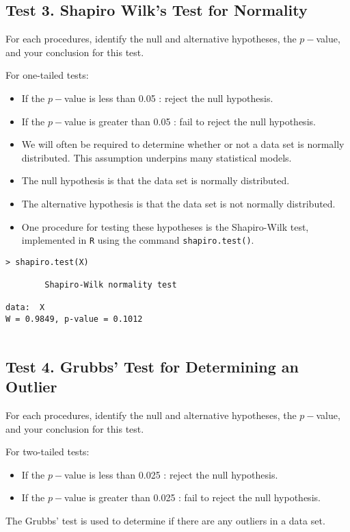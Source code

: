 \subsection*{Test 3. Shapiro Wilk's Test for Normality}

\begin{framed}
For each procedures, identify the null and alternative hypotheses, the $p-$value, and your conclusion for this test.

\noindent For one-tailed tests:
\begin{itemize}
\item If the $p-$value is less than 0.05 : reject the null hypothesis.
\item If the $p-$value is greater than 0.05 : fail to reject the null hypothesis.
\end{itemize}
\end{framed}

\begin{itemize}
\item We will often be required to determine whether or not a data set is normally distributed.
This assumption underpins many statistical models.
\item The null hypothesis is that the data set is normally distributed.
\item The alternative hypothesis is that the data set is not normally distributed.
\item One procedure for testing these hypotheses is the Shapiro-Wilk test, implemented in \texttt{R} using the command \texttt{shapiro.test()}.
\end{itemize}
\begin{framed}
\begin{verbatim}
> shapiro.test(X)

        Shapiro-Wilk normality test

data:  X
W = 0.9849, p-value = 0.1012


\end{verbatim}
\end{framed}
\subsection*{Test 4. Grubbs' Test for Determining an Outlier}

\begin{framed}
For each procedures, identify the null and alternative hypotheses, the $p-$value, and your conclusion for this test.

\noindent For two-tailed tests:
\begin{itemize}
\item If the $p-$value is less than 0.025 : reject the null hypothesis.
\item If the $p-$value is greater than 0.025 : fail to reject the null hypothesis.
\end{itemize}
\end{framed}
The Grubbs' test is used to determine if there are any outliers in a data set.\\ \bigskip

